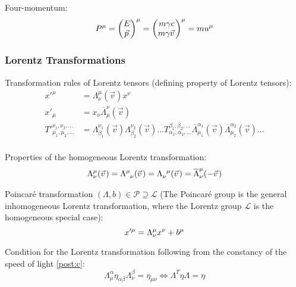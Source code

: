 			\noindent
			Four-momentum:
			\begin{equation}
				P^\mu =
				\mqty(
				E \\ \vec{p}
				)^\mu
				= \mqty(
				m\gamma c \\ m\gamma\vec{v}
				)^\mu
				= m u^\mu
			\end{equation}

		\subsubsection{Lorentz Transformations}
			\noindent
			Transformation rules of Lorentz tensors (defining property of Lorentz tensors):
			\begin{equation}
				\begin{aligned}
					{x'}^\mu &= \Lambda^{\mu}_{\nu}(\vec{v}) x^\nu \\
					{x'}_\mu &=  x_\nu \overline{\Lambda}_\mu^{\nu}(\vec{v}) \\
					{T'}_{\mu_1,\mu_2,...}^{\nu_1,\nu_2,...} &=  \Lambda^{\nu_1}_{\beta_1}(\vec{v}) \Lambda^{\nu_2}_{\beta_2}(\vec{v}) ... T_{\alpha_1,\alpha_2,...}^{\beta_1,\beta_2,...} \overline{\Lambda}_{\mu_1}^{\alpha_1}(\vec{v}) \overline{\Lambda}_{\mu_2}^{\alpha_2}(\vec{v}) ... \\
				\end{aligned}
			\end{equation}

			\noindent
			Properties of the homogeneous Lorentz transformation:
			\begin{equation}
				\Lambda^{\mu}_{\nu}(\vec{v}) = \Lambda^{\mu}_{\phantom{\mu}\nu}(\vec{v}) = \Lambda^{\phantom{\nu}\mu}_{\nu}(\vec{v}) = \overline{\Lambda}^{\mu}_{\nu}(-\vec{v}) \\
			\end{equation}

			\noindent
			Poincaré transformation $(\Lambda, b) \in\mathcal{P} \supseteq \mathcal{L}$ (The Poincaré group is the general inhomogeneous Lorentz transformation, where the Lorentz group $\mathcal{L}$ is the homogeneous special case):
			\begin{equation}
				x'^\mu = \Lambda^\mu_{\nu} x^\nu + b^\mu \\
			\end{equation}

			\noindent
			Condition for the Lorentz transformation following from the constancy of the speed of light \ref{post:c}:
			\begin{equation}
				\Lambda^{\alpha}_{\mu} \eta_{\alpha\beta} \Lambda^{\beta}_{\nu} = \eta_{\mu\nu}
				\iff \Lambda^T \eta \Lambda = \eta
			\end{equation}

